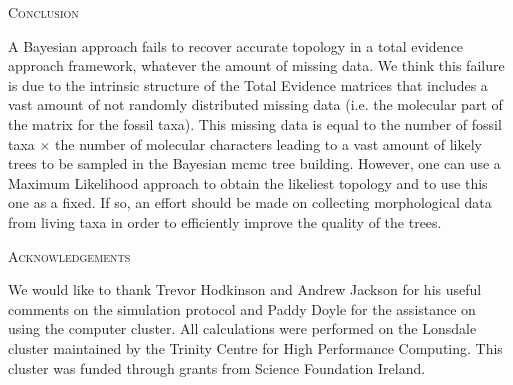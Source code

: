 \documentclass[12pt,letterpaper]{article}
\renewcommand{\section}[1]{%
\bigskip
\begin{center}
\begin{Large}
\normalfont\scshape #1
\medskip
\end{Large}
\end{center}}
\begin{document}
%
%


\section{Conclusion}
A Bayesian approach fails to recover accurate topology in a total evidence approach framework, whatever the amount of missing data.
We think this failure is due to the intrinsic structure of the Total Evidence matrices that includes a vast amount of not randomly distributed missing data (i.e. the molecular part of the matrix for the fossil taxa).
This missing data is equal to the number of fossil taxa $\times$ the number of molecular characters leading to a vast amount of likely trees to be sampled in the Bayesian mcmc tree building.
However, one can use a Maximum Likelihood approach to obtain the likeliest topology and to use this one as a fixed.
If so, an effort should be made on collecting morphological data from living taxa in order to efficiently improve the quality of the trees.


%
%


\section{Acknowledgements}
We would like to thank Trevor Hodkinson and Andrew Jackson %
for his useful comments on the simulation protocol and Paddy Doyle for the assistance on using the computer cluster.
All calculations were performed on the Lonsdale cluster maintained by the Trinity Centre for High Performance Computing.
This cluster was funded through grants from Science Foundation Ireland.

\end{document}

